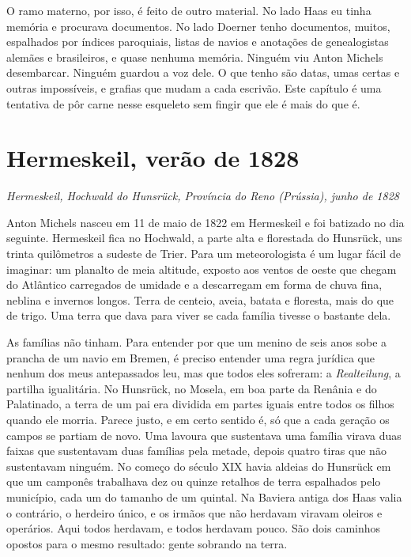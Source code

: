 \documentclass[
  brazilian,
  11pt,
  openany]{book}
\begin{document}
O ramo materno, por isso, é feito de outro material. No lado Haas eu
tinha memória e procurava documentos. No lado Doerner tenho documentos,
muitos, espalhados por índices paroquiais, listas de navios e anotações
de genealogistas alemães e brasileiros, e quase nenhuma memória. Ninguém
viu Anton Michels desembarcar. Ninguém guardou a voz dele. O que tenho
são datas, umas certas e outras impossíveis, e grafias que mudam a cada
escrivão. Este capítulo é uma tentativa de pôr carne nesse esqueleto sem
fingir que ele é mais do que é.

\section{Hermeskeil, verão de 1828}\label{hermeskeil-veruxe3o-de-1828}

\emph{Hermeskeil, Hochwald do Hunsrück, Província do Reno (Prússia),
junho de 1828}

Anton Michels nasceu em 11 de maio de 1822 em Hermeskeil e foi batizado
no dia seguinte. Hermeskeil fica no Hochwald, a parte alta e florestada
do Hunsrück, uns trinta quilômetros a sudeste de Trier. Para um
meteorologista é um lugar fácil de imaginar: um planalto de meia
altitude, exposto aos ventos de oeste que chegam do Atlântico carregados
de umidade e a descarregam em forma de chuva fina, neblina e invernos
longos. Terra de centeio, aveia, batata e floresta, mais do que de
trigo. Uma terra que dava para viver se cada família tivesse o bastante
dela.

As famílias não tinham. Para entender por que um menino de seis anos
sobe a prancha de um navio em Bremen, é preciso entender uma regra
jurídica que nenhum dos meus antepassados leu, mas que todos eles
sofreram: a \emph{Realteilung}, a partilha igualitária. No Hunsrück, no
Mosela, em boa parte da Renânia e do Palatinado, a terra de um pai era
dividida em partes iguais entre todos os filhos quando ele morria.
Parece justo, e em certo sentido é, só que a cada geração os campos se
partiam de novo. Uma lavoura que sustentava uma família virava duas
faixas que sustentavam duas famílias pela metade, depois quatro tiras
que não sustentavam ninguém. No começo do século XIX havia aldeias do
Hunsrück em que um camponês trabalhava dez ou quinze retalhos de terra
espalhados pelo município, cada um do tamanho de um quintal. Na Baviera
antiga dos Haas valia o contrário, o herdeiro único, e os irmãos que não
herdavam viravam oleiros e operários. Aqui todos herdavam, e todos
herdavam pouco. São dois caminhos opostos para o mesmo resultado: gente
sobrando na terra.
\end{document}
